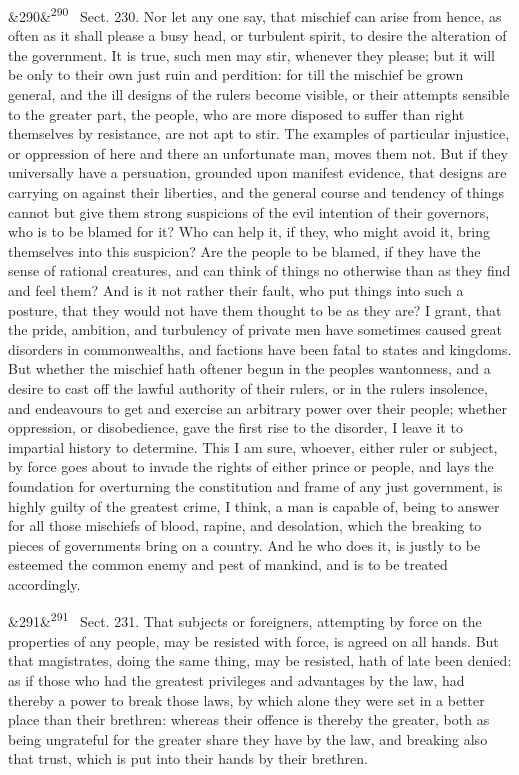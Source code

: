 \documentclass[12pt]{article}
\newcommand{\para}[1][]{\par\noindent\ifx&#1&\else\textsuperscript{\footnotesize #1}~\fi}
\begin{document}
\para[290] Sect. 230. Nor let any one say, that mischief can arise from hence, as often as it shall please a busy head, or turbulent spirit, to desire the alteration of the government. It is true, such men may stir, whenever they please; but it will be only to their own just ruin and perdition: for till the mischief be grown general, and the ill designs of the rulers become visible, or their attempts sensible to the greater part, the people, who are more disposed to suffer than right themselves by resistance, are not apt to stir. The examples of particular injustice, or oppression of here and there an unfortunate man, moves them not. But if they universally have a persuation, grounded upon manifest evidence, that designs are carrying on against their liberties, and the general course and tendency of things cannot but give them strong suspicions of the evil intention of their governors, who is to be blamed for it? Who can help it, if they, who might avoid it, bring themselves into this suspicion? Are the people to be blamed, if they have the sense of rational creatures, and can think of things no otherwise than as they find and feel them? And is it not rather their fault, who put things into such a posture, that they would not have them thought to be as they are? I grant, that the pride, ambition, and turbulency of private men have sometimes caused great disorders in commonwealths, and factions have been fatal to states and kingdoms. But whether the mischief hath oftener begun in the peoples wantonness, and a desire to cast off the lawful authority of their rulers, or in the rulers insolence, and endeavours to get and exercise an arbitrary power over their people; whether oppression, or disobedience, gave the first rise to the disorder, I leave it to impartial history to determine. This I am sure, whoever, either ruler or subject, by force goes about to invade the rights of either prince or people, and lays the foundation for overturning the constitution and frame of any just government, is highly guilty of the greatest crime, I think, a man is capable of, being to answer for all those mischiefs of blood, rapine, and desolation, which the breaking to pieces of governments bring on a country. And he who does it, is justly to be esteemed the common enemy and pest of mankind, and is to be treated accordingly.

\para[291] Sect. 231. That subjects or foreigners, attempting by force on the properties of any people, may be resisted with force, is agreed on all hands. But that magistrates, doing the same thing, may be resisted, hath of late been denied: as if those who had the greatest privileges and advantages by the law, had thereby a power to break those laws, by which alone they were set in a better place than their brethren: whereas their offence is thereby the greater, both as being ungrateful for the greater share they have by the law, and breaking also that trust, which is put into their hands by their brethren.
\end{document}
